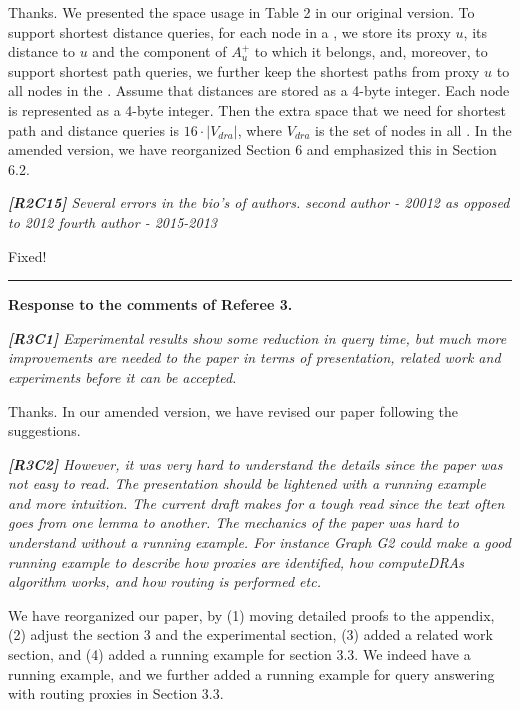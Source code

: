 \documentclass[11pt]{letter}
\newcommand{\vs}{\vspace{1ex}}
\newcommand{\svs}{\vspace{0.36ex}}
\begin{document}
\svs
Thanks. We presented the space usage in Table 2 in our original version. To support shortest distance queries, for each node in a \dra, we store its proxy $u$, its distance to $u$ and the component of $A^{+}_u$ to which it belongs, and, moreover, to support shortest path queries, we further keep the shortest paths from proxy $u$ to all nodes in the \dra. Assume that distances are stored as a 4-byte integer. Each node is represented as a 4-byte integer. Then the extra space that we need for shortest path and distance queries is $16\cdot |V_{dra}|$, where $V_{dra}$ is the set of nodes in all \dras. In the amended version, we have reorganized Section 6 and emphasized this in Section 6.2.

\vs
\noindent
{\em{\bf[R2C15]} Several errors in the bio's of authors.
second author - 20012 as opposed to 2012
fourth author - 2015-2013}

\svs
Fixed!










\vspace{2.8ex}
\hrule
\vspace{0.6ex}
{\bf Response to the comments of Referee 3.}


\vs
\noindent
{\em{\bf[R3C1]}
Experimental results show some reduction in query time, but much more improvements are needed to the paper in terms of presentation, related work and experiments before it can be accepted.}
\svs

Thanks. In our amended version, we have revised our paper following the suggestions.



\vs
\noindent
{\em{\bf[R3C2]}  However, it was very hard to understand the details since the paper was not easy to read. The presentation should be lightened with a running example and more intuition.  The current draft makes for a tough read since the text often goes from one lemma to another. The mechanics of the paper was hard to understand without a running example.  For instance Graph G2 could make a good running example to describe how proxies are identified, how computeDRAs algorithm works, and how routing is performed etc.}
\svs

We have reorganized our paper, by (1) moving detailed proofs to the appendix, (2) adjust the section 3 and the experimental section, (3) added a related work section, and (4) added a running example for section 3.3. We indeed have a running example, and we further added a running example for query answering with routing proxies in Section 3.3.
\end{document}
